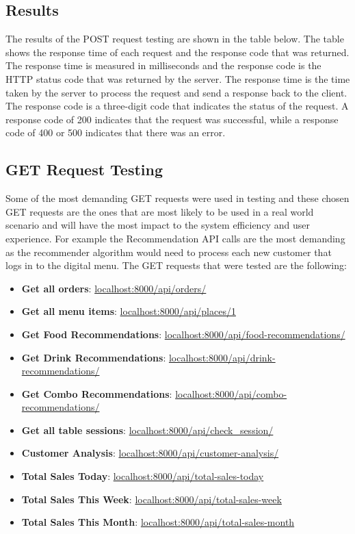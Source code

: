 \subsection*{Results}
The results of the POST request testing are shown in the table below. The table shows the response time of each request and the response code that was returned. The response time is measured in milliseconds and the response code is the HTTP status code that was returned by the server. The response time is the time taken by the server to process the request and send a response back to the client. The response code is a three-digit code that indicates the status of the request. A response code of 200 indicates that the request was successful, while a response code of 400 or 500 indicates that there was an error.

\subsection{GET Request Testing}
Some of the most demanding GET requests were used in testing and these chosen GET requests are the ones that are most likely to be used in a real world scenario and will have the most impact to the system efficiency and user experience. For example the Recommendation API calls are the most demanding as the recommender algorithm would need to process each new customer that logs in to the digital menu. The GET requests that were tested are the following:

    \begin{itemize}
        \item \textbf{Get all orders}: \url{localhost:8000/api/orders/}
        \item \textbf{Get all menu items}: \url{localhost:8000/api/places/1}
        \item \textbf{Get Food Recommendations}: \url{localhost:8000/api/food-recommendations/}
        \item \textbf{Get Drink Recommendations}: \url{localhost:8000/api/drink-recommendations/}
        \item \textbf{Get Combo Recommendations}: \url{localhost:8000/api/combo-recommendations/}
        \item \textbf{Get all table sessions}: \url{localhost:8000/api/check_session/}
        \item \textbf{Customer Analysis}: \url{localhost:8000/api/customer-analysis/}
        \item \textbf{Total Sales Today}: \url{localhost:8000/api/total-sales-today}
        \item \textbf{Total Sales This Week}: \url{localhost:8000/api/total-sales-week}
        \item \textbf{Total Sales This Month}: \url{localhost:8000/api/total-sales-month}
    \end{itemize}

